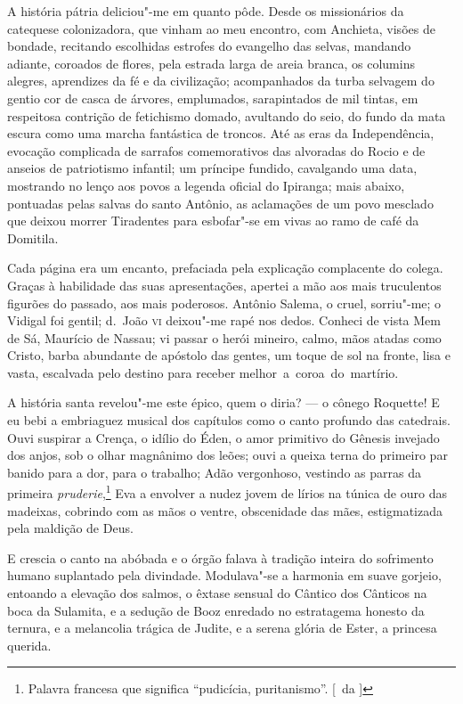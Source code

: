 A história pátria deliciou"-me em quanto pôde. Desde os missionários da 
catequese colonizadora, que vinham ao meu encontro, com Anchieta, visões de
bondade, recitando escolhidas estrofes do evangelho das selvas,
mandando adiante, coroados de flores, pela estrada larga de areia
branca, os columins alegres, aprendizes da fé e da civilização;
acompanhados da turba selvagem do gentio cor de casca de árvores,
emplumados, sarapintados de mil tintas, em respeitosa contrição de
fetichismo domado, avultando do seio, do fundo da mata escura como uma
marcha fantástica de troncos. Até as eras da Independência, evocação
complicada de sarrafos comemorativos das alvoradas do Rocio e de
anseios de patriotismo infantil; um príncipe fundido, cavalgando uma
data, mostrando no lenço aos povos a legenda oficial do Ipiranga; mais
abaixo, pontuadas pelas salvas do santo Antônio, as aclamações de um
povo mesclado que deixou morrer Tiradentes para esbofar"-se em vivas
ao ramo de café da Domitila. 

Cada página era um encanto, prefaciada pela explicação
complacente do colega. Graças à habilidade das suas apresentações,
apertei a mão aos mais truculentos figurões do passado, aos mais
poderosos. Antônio Salema, o cruel, sorriu"-me; o Vidigal foi gentil;
d.~João \textsc{vi} deixou"-me rapé nos dedos. Conheci de vista Mem de Sá,
Maurício de Nassau; vi passar o herói mineiro, calmo, mãos atadas como
Cristo, barba abundante de apóstolo das gentes, um toque de sol na
fronte, lisa e vasta, escalvada pelo destino para receber \mbox{melhor a
coroa do martírio.} 

A história santa revelou"-me este épico, quem o
diria? --- o cônego Roquette! E eu bebi a embriaguez musical dos
capítulos como o canto profundo das catedrais. Ouvi suspirar a Crença,
o idílio do Éden, o amor primitivo do Gênesis invejado dos anjos, sob o
olhar magnânimo dos leões; ouvi a queixa terna do primeiro par banido
para a dor, para o trabalho; Adão vergonhoso, vestindo as parras da
primeira \textit{pruderie},\footnote{ Palavra francesa que significa ``pudicícia, puritanismo''. [~da ]} Eva a envolver a nudez jovem de lírios na túnica de
ouro das madeixas, cobrindo com as mãos o ventre, obscenidade das mães,
estigmatizada pela maldição de Deus. 


E crescia o canto na abóbada e o
órgão falava à tradição inteira do sofrimento humano suplantado pela
divindade. Modulava"-se a harmonia em suave gorjeio, entoando a
elevação dos salmos, o êxtase sensual do Cântico dos Cânticos na boca
da Sulamita, e a sedução de Booz enredado no estratagema honesto da
ternura, e a melancolia trágica de Judite, e a serena glória de Ester,
a princesa querida. 

